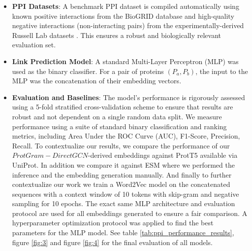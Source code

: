 \documentclass[utf8]{article}
\begin{document}
\begin{itemize}
\begin{itemize}
			\item The final weights $alpha_i$ come from applying Softmax to the raw scores. This step normalizes scores into a probability distribution: $\alpha_i = \frac{\exp(s_i)}{\sum_{j=1}^{n} \exp(s_j)}$.
			
			\item We next compute the weighted average of the n-gram embeddings using the attention weights. This produces the final, attention-pooled per-protein embedding vector. The final per-protein embeddings is the weighted sum of the n-gram vectors, each scaled by its attention weight: $\mathbf{v}_{\text{protein}} = \sum_{i=1}^{n} \alpha_i \mathbf{v}_i$.
			
			\item This final vector, $\mathbf{v}_{\text{protein}}$, represents the protein, reflecting the contribution of its most important n-grams as determined by self-attention.
		\end{itemize}
		
		
		\item \textbf{PPI Datasets}: A benchmark PPI dataset is compiled automatically using known positive interactions from the BioGRID database \cite{oughtred_biogriddatabasecomprehensive_2021} and high-quality negative interactions (non-interacting pairs) from the experimentally-derived Russell Lab datasets \cite{trabuco_negativeproteinprotein_2012}. This ensures a robust and biologically relevant evaluation set.
		
		\item \textbf{Link Prediction Model}: A standard Multi-Layer Perceptron (MLP) was used as the binary classifier. For a pair of proteins $(P_a, P_b)$, the input to the MLP was the concatenation of their embedding vectors.
		
		\item \textbf{Evaluation and Baselines}: The model's performance is rigorously assessed using a 5-fold stratified cross-validation scheme to ensure that results are robust and not dependent on a single random data split. We measure performance using a suite of standard binary classification and ranking metrics, including Area Under the ROC Curve (AUC), F1-Score, Precision, Recall. To contextualize our results, we compare the performance of our $ProtGram-DirectGCN$-derived embeddings against ProtT5 \cite{elnaggar_prottransunderstandinglanguage_2022} available via UniProt. In addition we compare it against ESM \cite{rao_transformerproteinlanguage_2020} where we performed the inference and the embedding generation manually. And finally to further contextualize our work we train a Word2Vec model \cite{mikolov_distributedrepresentationswords_2013} on the concatenated sequences with a context window of 10 tokens with skip-gram and negative sampling for 10 epochs. The exact same MLP architecture and evaluation protocol are used for all embeddings generated to ensure a fair comparison. A hyperparameter optimization protocol was applied to find the best parameters for the MLP model. See table \ref{tab:ppi_performance_results}, figure \ref{fig:3} and figure \ref{fig:4} for the final evaluation of all models.
	\end{itemize}
	
\end{document}
